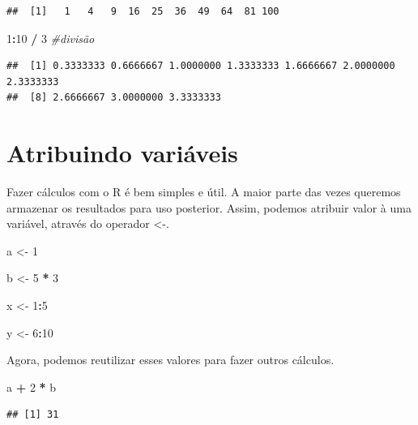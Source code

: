 \documentclass[
]{book}
\newenvironment{Shaded}{\begin{snugshade}}{\end{snugshade}}
\newcommand{\CommentTok}[1]{\textcolor[rgb]{0.56,0.35,0.01}{\textit{#1}}}
\newcommand{\DecValTok}[1]{\textcolor[rgb]{0.00,0.00,0.81}{#1}}
\newcommand{\NormalTok}[1]{#1}
\newcommand{\OtherTok}[1]{\textcolor[rgb]{0.56,0.35,0.01}{#1}}
\newcommand{\SpecialCharTok}[1]{\textcolor[rgb]{0.81,0.36,0.00}{\textbf{#1}}}
\begin{document}
\begin{verbatim}
##  [1]   1   4   9  16  25  36  49  64  81 100
\end{verbatim}

\begin{Shaded}
\begin{Highlighting}[]
\DecValTok{1}\SpecialCharTok{:}\DecValTok{10} \SpecialCharTok{/} \DecValTok{3}                        \CommentTok{\#divisão}
\end{Highlighting}
\end{Shaded}

\begin{verbatim}
##  [1] 0.3333333 0.6666667 1.0000000 1.3333333 1.6666667 2.0000000 2.3333333
##  [8] 2.6666667 3.0000000 3.3333333
\end{verbatim}

\section{Atribuindo variáveis}\label{atribuindo-variuxe1veis}

Fazer cálculos com o R é bem simples e útil.
A maior parte das vezes queremos armazenar os resultados para uso posterior.
Assim, podemos atribuir valor à uma variável, através do operador \textless-.

\begin{Shaded}
\begin{Highlighting}[]
\NormalTok{a }\OtherTok{\textless{}{-}} \DecValTok{1}

\NormalTok{b }\OtherTok{\textless{}{-}} \DecValTok{5} \SpecialCharTok{*} \DecValTok{3}

\NormalTok{x }\OtherTok{\textless{}{-}} \DecValTok{1}\SpecialCharTok{:}\DecValTok{5}

\NormalTok{y }\OtherTok{\textless{}{-}} \DecValTok{6}\SpecialCharTok{:}\DecValTok{10}
\end{Highlighting}
\end{Shaded}

Agora, podemos reutilizar esses valores para fazer outros cálculos.

\begin{Shaded}
\begin{Highlighting}[]
\NormalTok{a }\SpecialCharTok{+} \DecValTok{2} \SpecialCharTok{*}\NormalTok{ b}
\end{Highlighting}
\end{Shaded}

\begin{verbatim}
## [1] 31
\end{verbatim}
\end{document}
